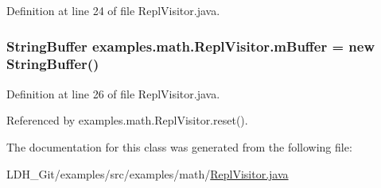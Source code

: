 Definition at line 24 of file Repl\-Visitor.\-java.

\hypertarget{classexamples_1_1math_1_1_repl_visitor_a6e79e7ebca0ee2e73f254624da8ca097}{
\subsubsection[{m\-Buffer}]{\setlength{\rightskip}{0pt plus 5cm}String\-Buffer examples.\-math.\-Repl\-Visitor.\-m\-Buffer = new String\-Buffer()\hspace{0.3cm}{\ttfamily [private]}}}\label{classexamples_1_1math_1_1_repl_visitor_a6e79e7ebca0ee2e73f254624da8ca097}


Definition at line 26 of file Repl\-Visitor.\-java.



Referenced by examples.\-math.\-Repl\-Visitor.\-reset().



The documentation for this class was generated from the following file\-:\begin{DoxyCompactItemize}
\item 
L\-D\-H\-\_\-\-Git/examples/src/examples/math/\hyperlink{_repl_visitor_8java}{Repl\-Visitor.\-java}\end{DoxyCompactItemize}
